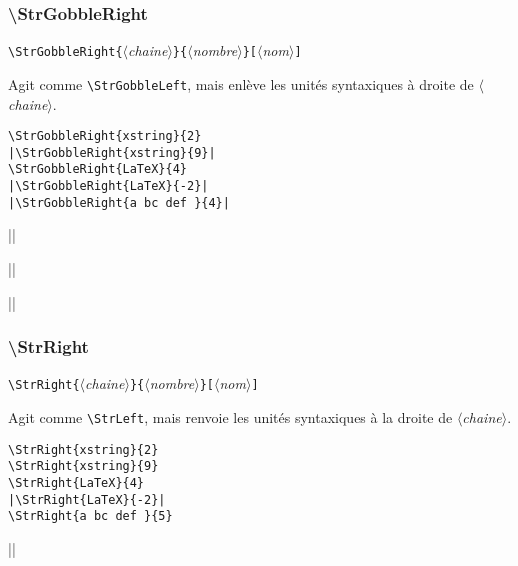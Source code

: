\documentclass[a4paper,10pt]{article}
\newcommand\argu[1]{$\langle$\textit{#1}$\rangle$}
\newcommand\ARGU[1]{\texttt{\color{black}\{}\argu{#1}\texttt{\color{black}\}}}
\newcommand\arguC[1]{\texttt{\color{black}[}\argu{#1}\texttt{\color{black}]}}
\newcommand\USs{unités syntaxiques\xspace}
\newcommand\styleexemple{\small\vskip4pt}
\newcommand\verbinline{\lstinline[basicstyle=\normalsize\ttfamily]}
\begin{document}
\subsubsection{\ttfamily\textbackslash StrGobbleRight}
\verbinline|\StrGobbleRight|\ARGU{chaine}\ARGU{nombre}\arguC{nom}
\smallskip

Agit comme \verbinline|\StrGobbleLeft|, mais enlève les \USs à droite de \argu{chaine}.

\begin{minipage}[t]{0.65\linewidth}
\begin{lstlisting}
\StrGobbleRight{xstring}{2}
|\StrGobbleRight{xstring}{9}|
\StrGobbleRight{LaTeX}{4}
|\StrGobbleRight{LaTeX}{-2}|
|\StrGobbleRight{a bc def }{4}|
\end{lstlisting}%
\end{minipage}\hfill
\begin{minipage}[t]{0.35\linewidth}
	\styleexemple
	\par
	||\par
	\par
	||\par
	||
\end{minipage}%

\subsubsection{\ttfamily\textbackslash StrRight}
\verbinline|\StrRight|\ARGU{chaine}\ARGU{nombre}\arguC{nom}
\smallskip

Agit comme \verbinline|\StrLeft|, mais renvoie les \USs à la droite de \argu{chaine}.

\begin{minipage}[t]{0.65\linewidth}
\begin{lstlisting}
\StrRight{xstring}{2}
\StrRight{xstring}{9}
\StrRight{LaTeX}{4}
|\StrRight{LaTeX}{-2}|
\StrRight{a bc def }{5}
\end{lstlisting}%
\end{minipage}\hfill
\begin{minipage}[t]{0.35\linewidth}
	\styleexemple
	\par
	\par
	\par
	||\par
\end{minipage}%
\end{document}
